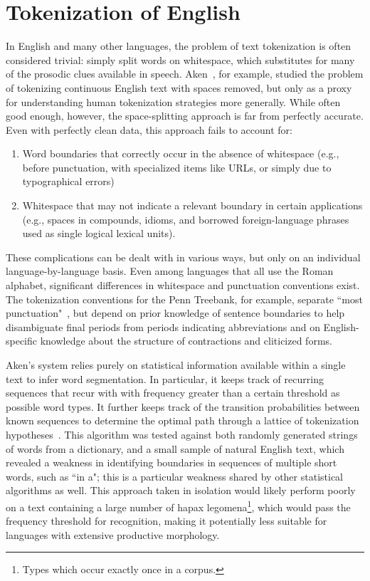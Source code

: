 \section{Tokenization of English}
In English and many other languages, the problem of text tokenization is often considered trivial: simply split words on whitespace, which substitutes for many of the prosodic clues available in speech. Aken~\cite{aken11}, for example, studied the problem of tokenizing continuous English text with spaces removed, but only as a proxy for understanding human tokenization strategies more generally. While often good enough, however, the space-splitting approach is far from perfectly accurate. Even with perfectly clean data, this approach fails to account for:
\begin{enumerate}
	\item Word boundaries that correctly occur in the absence of whitespace (e.g., before punctuation, with specialized items like URLs, or simply due to typographical errors)
	\item Whitespace that may not indicate a relevant boundary in certain applications (e.g., spaces in compounds, idioms, and borrowed foreign-language phrases used as single logical lexical units).
\end{enumerate}
These complications can be dealt with in various ways, but only on an individual language-by-language basis. Even among languages that all use the Roman alphabet, significant differences in whitespace and punctuation conventions exist. The tokenization conventions for the Penn Treebank, for example, separate ``most punctuation"~\cite{treebank}, but depend on prior knowledge of sentence boundaries to help disambiguate final periods from periods indicating abbreviations and on English-specific knowledge about the structure of contractions and cliticized forms.

Aken's system relies purely on statistical information available within a single text to infer word segmentation. In particular, it keeps track of recurring sequences that recur with with frequency greater than a certain threshold as possible word types. It further keeps track of the transition probabilities between known sequences to determine the optimal path through a lattice of tokenization hypotheses~\cite{aken11}. This algorithm was tested against both randomly generated strings of words from a dictionary, and a small sample of natural English text, which revealed a weakness in identifying boundaries in sequences of multiple short words, such as ``in a"; this is a particular weakness shared by other statistical algorithms as well. This approach taken in isolation would likely perform poorly on a text containing a large number of hapax legomena\footnote{Types which occur exactly once in a corpus.}, which would pass the frequency threshold for recognition, making it potentially less suitable for languages with extensive productive morphology.

